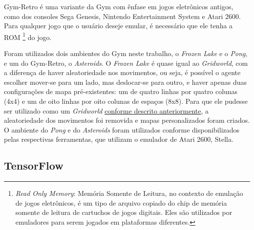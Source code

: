 Gym-Retro é uma variante da Gym com ênfase em jogos eletrônicos antigos, como dos consoles Sega Genesis, Nintendo Entertainment System e Atari 2600.
Para qualquer jogo que o usuário deseje emular, é necessário que ele tenha a ROM \footnote{\textit{Read Only Memory}: Memória Somente de Leitura, no contexto de emulação de jogos eletrônicos, é um tipo de arquivo copiado do chip de memória somente de leitura de cartuchos de jogos digitais. Eles são utilizados por emuladores para serem jogados em plataformas diferentes.} do jogo.

Foram utilizados dois ambientes do Gym neste trabalho, o \textit{Frozen Lake} e o \textit{Pong}, e um do Gym-Retro, o \textit{Asteroids}.
O \textit{Frozen Lake} é quase igual ao \textit{Gridworld}, com a diferença de haver aleatoriedade nos movimentos, ou seja, é possível o agente escolher mover-se para um lado, mas deslocar-se para outro, e haver apenas duas configurações de mapa pré-existentes: um de quatro linhas por quatro colunas (4x4) e um de oito linhas por oito colunas de espaços (8x8).
Para que ele pudesse ser utilizado como um \textit{Gridworld} \hyperref[sec:gridworld]{conforme descrito anteriormente}, a aleatoriedade dos movimentos foi removida e mapas personalizados foram criados.
O ambiente do \textit{Pong} e do \textit{Asteroids} foram utilizados conforme disponibilizados pelas respectivas ferramentas, que utilizam o emulador de Atari 2600, Stella.


\subsection{TensorFlow}
\label{sec:tensorflow}

